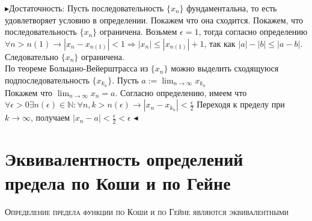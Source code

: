 \documentclass[14pt]{article}
\begin{document}
        $\blacktriangleright$Достаточность: Пусть последовательность $\{x_n\}$ фундаментальна, то есть удовлетворяет условию в определении. Покажем что она сходится. 
        Покажем, что последовательность $\{x_n\}$ ограничена. Возьмем $\epsilon = 1$, тогда согласно определению $\forall n > n(1) \rightarrow |x_n - x_{n(1)}| < 1 \Rightarrow |x_n| \leqslant |x_{n(1)}| + 1$, так как $|a|-|b|\leqslant |a-b|.$ Следовательно $\{x_n\}$ ограничена. \\ 
        По теореме Больцано-Вейерштрасса из $\{x_n\}$ можно выделить сходящуюся подпоследовательность $\{x_{k_n}\}$. Пусть $a:=\lim_{n\rightarrow \infty}x_{k_n}$ \\ 
        Покажем что $\lim_{n\rightarrow\infty}x_n = a$. Согласно определению, имеем что $\forall \epsilon > 0 \exists n(\epsilon) \in \mathbb{N}: \forall n,k > n(\epsilon) \rightarrow |x_n - x_{k_n}| < \frac{\epsilon}{2}$ Переходя к пределу при $k \rightarrow \infty$, получаем $|x_n - a| < \frac{\epsilon}{2} < \epsilon$
        $\blacktriangleleft$\\

    \section{Эквивалентность определений предела по Коши и по Гейне}
        \textsc{Определение предела функции по Коши и по Гейне являются эквивалентными}
\end{document}
